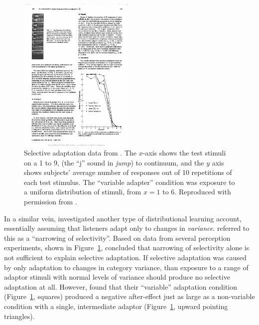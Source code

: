 \begin{figure}[!t]
  \centering
  \includegraphics[width=0.5\textwidth]{cole-cooper-1977-fig3.pdf}
  \caption{Selective adaptation data from \protect{}.  The $x$-axis shows the test stimuli on a 1 to 9,  (the ``j'' sound in \emph{jump}) to  continuum, and the $y$ axis shows subjects' average number of  responses out of 10 repetitions of each test stimulus.  The ``variable adapter'' condition was exposure to a uniform distribution of stimuli, from $x=1$ to 6. Reproduced with permission from \protect{}.}
  \label{fig:cole-1977-range-fixed-adaptors}
\end{figure}

In a similar vein,  investigated another type of distributional learning account, essentially assuming that listeners adapt only to changes in \emph{variance}. \citeauthor{Cole1977} referred to this as a ``narrowing of selectivity''. Based on data from several perception experiments, shown in Figure~\ref{fig:cole-1977-range-fixed-adaptors}, \citeauthor{Cole1977} concluded that narrowing of selectivity alone is not sufficient to explain selective adaptation.  If selective adaptation was caused by only adaptation to changes in category variance, than exposure to a range of adaptor stimuli with normal levels of variance should produce no selective adaptation at all.  However,  found that their ``variable'' adaptation condition (Figure~\ref{fig:cole-1977-range-fixed-adaptors}, squares) produced a negative after-effect just as large as a non-variable condition with a single, intermediate adaptor (Figure~\ref{fig:cole-1977-range-fixed-adaptors}, upward pointing triangles).

